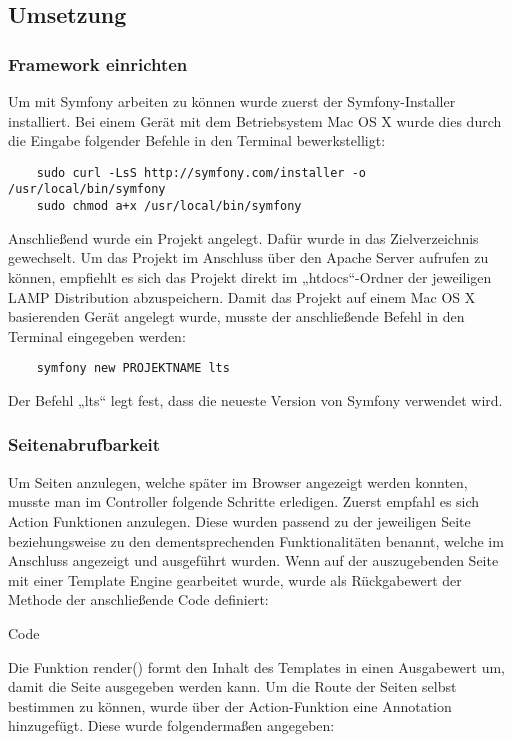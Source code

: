  \subsection{Umsetzung}

    \subsubsection{Framework einrichten}

	Um mit Symfony arbeiten zu können wurde zuerst der Symfony-Installer installiert. Bei einem Gerät mit dem Betriebsystem Mac OS X wurde dies durch die Eingabe folgender Befehle in den Terminal bewerkstelligt:
	\lstset{language = bash}
  	\begin{lstlisting}
	sudo curl -LsS http://symfony.com/installer -o /usr/local/bin/symfony
	sudo chmod a+x /usr/local/bin/symfony
  	\end{lstlisting}

	Anschließend wurde ein Projekt angelegt. Dafür wurde in das Zielverzeichnis gewechselt. Um das Projekt im Anschluss über den Apache Server aufrufen zu können, empfiehlt es sich das Projekt direkt im „htdocs“-Ordner der jeweiligen LAMP Distribution abzuspeichern. Damit das Projekt auf einem Mac OS X basierenden Gerät angelegt wurde, musste der anschließende Befehl in den Terminal eingegeben werden:
	\lstset{language = bash}
  	\begin{lstlisting}
	symfony new PROJEKTNAME lts
  	\end{lstlisting}
	Der Befehl „lts“ legt fest, dass die neueste Version von Symfony verwendet wird.

    \subsubsection{Seitenabrufbarkeit}

	Um Seiten anzulegen, welche später im Browser angezeigt werden konnten, musste man im Controller folgende Schritte erledigen. Zuerst empfahl es sich Action Funktionen anzulegen. Diese wurden passend zu der jeweiligen Seite beziehungsweise zu den dementsprechenden Funktionalitäten benannt, welche im Anschluss angezeigt und ausgeführt wurden. Wenn auf der auszugebenden Seite mit einer Template Engine gearbeitet wurde, wurde als Rückgabewert der Methode der anschließende Code definiert:
	
	Code
	
	Die Funktion render() formt den Inhalt des Templates in einen Ausgabewert um, damit die Seite  ausgegeben werden kann.
	Um die Route der Seiten selbst bestimmen zu können, wurde über der Action-Funktion eine Annotation hinzugefügt. Diese wurde folgendermaßen angegeben:
	
